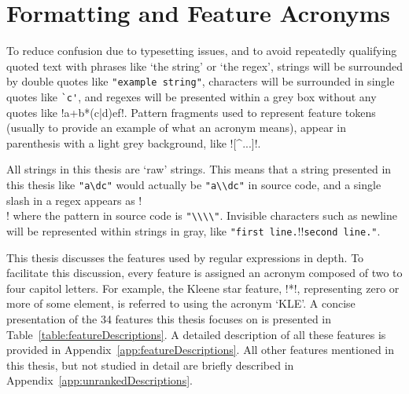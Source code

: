 \section{Formatting and Feature Acronyms}
To reduce confusion due to typesetting issues, and to avoid repeatedly qualifying quoted text with phrases like `the string' or `the regex', strings will be surrounded by double quotes like \verb!"example string"!, characters will be surrounded in single quotes like \verb!`c'!, and regexes will be presented within a grey box without any quotes like \cverb!a+b*(c|d)e\1f!.  Pattern fragments used to represent feature tokens (usually to provide an example of what an acronym means), appear in parenthesis with a light grey background, like \bverb![^...]!.

All strings in this thesis are `raw' strings.  This means that a string presented in this thesis like \verb!"a\dc"! would actually be \verb!"a\\dc"! in source code, and a single slash in a regex appears as \cverb!\\! where the pattern in source code is \verb!"\\\\"!.  Invisible characters such as newline will be represented within strings in gray, like \verb!"first line.!\gverb!\n!\verb!second line."!.

This thesis discusses the features used by regular expressions in depth.  To facilitate this discussion, every feature is assigned an acronym composed of two to four capitol letters.  For example, the Kleene star feature, \bverb!*!, representing zero or more of some element, is referred to using the acronym `KLE'.  A concise presentation of the 34 features this thesis focuses on is presented in Table~\ref{table:featureDescriptions}.  A detailed description of all these features is provided in Appendix~\ref{app:featureDescriptions}.  All other features mentioned in this thesis, but not studied in detail are briefly described in Appendix~\ref{app:unrankedDescriptions}.
